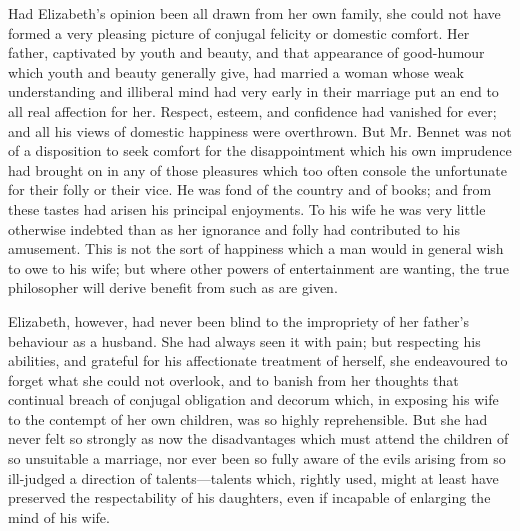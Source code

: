 \documentclass[12pt]{book}
\begin{document}
Had Elizabeth's opinion been all drawn from her own family, she could not have formed a very pleasing picture of conjugal felicity or domestic comfort. Her father, captivated by youth and beauty, and that appearance of good-humour which youth and beauty generally give, had married a woman whose weak understanding and illiberal mind had very early in their marriage put an end to all real affection for her. Respect, esteem, and confidence had vanished for ever; and all his views of domestic happiness were overthrown. But Mr. Bennet was not of a disposition to seek comfort for the disappointment which his own imprudence had brought on in any of those pleasures which too often console the unfortunate for their folly or their vice. He was fond of the country and of books; and from these tastes had arisen his principal enjoyments. To his wife he was very little otherwise indebted than as her ignorance and folly had contributed to his amusement. This is not the sort of happiness which a man would in general wish to owe to his wife; but where other powers of entertainment are wanting, the true philosopher will derive benefit from such as are given.

Elizabeth, however, had never been blind to the impropriety of her father's behaviour as a husband. She had always seen it with pain; but respecting his abilities, and grateful for his affectionate treatment of herself, she endeavoured to forget what she could not overlook, and to banish from her thoughts that continual breach of conjugal obligation and decorum which, in exposing his wife to the contempt of her own children, was so highly reprehensible. But she had never felt so strongly as now the disadvantages which must attend the children of so unsuitable a marriage, nor ever been so fully aware of the evils arising from so ill-judged a direction of talents---talents which, rightly used, might at least have preserved the respectability of his daughters, even if incapable of enlarging the mind of his wife.
\end{document}
